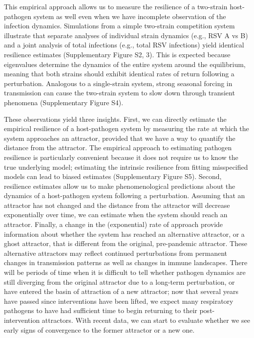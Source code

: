 \documentclass[12pt]{article}
\begin{document}
This empirical approach allows us to measure the resilience of a two-strain host-pathogen system as well even when we have incomplete observation of the infection dynamics.
Simulations from a simple two-strain competition system illustrate that separate analyses of individual strain dynamics (e.g., RSV A vs B) and a joint analysis of total infections (e.g., total RSV infections) yield identical resilience estimates (Supplementary Figure S2, 3).
This is expected because eigenvalues determine the dynamics of the entire system around the equilibrium, meaning that both strains should exhibit identical rates of return following a perturbation.
Analogous to a single-strain system, strong seasonal forcing in transmission can cause the two-strain system to slow down through transient phenomena (Supplementary Figure S4).

These observations yield three insights.
First, we can directly estimate the empirical resilience of a host-pathogen system by measuring the rate at which the system approaches an attractor, provided that we have a way to quantify the distance from the attractor.
The empirical approach to estimating pathogen resilience is particularly convenient because it does not require us to know the true underlying model;
estimating the intrinsic resilience from fitting misspecified models can lead to biased estimates (Supplementary Figure S5).
Second, resilience estimates allow us to make phenomenological predictions about the dynamics of a host-pathogen system following a perturbation.
Assuming that an attractor has not changed and the distance from the attractor will decrease exponentially over time, we can estimate when the system should reach an attractor.
Finally, a change in the (exponential) rate of approach provide information about whether the system has reached an alternative attractor, or a ghost attractor, that is different from the original, pre-pandemic attractor.
These alternative attractors may reflect continued perturbations from permanent changes in transmission patterns as well as changes in immune landscapes.
There will be periods of time when it is difficult to tell whether pathogen dynamics are still diverging from the original attractor due to a long-term perturbation, or have entered the basin of attraction of a new attractor; 
now that several years have passed since interventions have been lifted, we expect many respiratory pathogens to have had sufficient time to begin returning to their post-intervention attractors.
With recent data, we can start to evaluate whether we see early signs of convergence to the former attractor or a new one.
\end{document}
